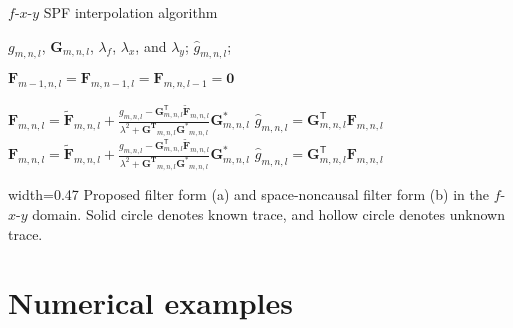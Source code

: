 \renewcommand{\algorithmicrequire}{\textbf{Input:}}
\renewcommand{\algorithmicensure}{\textbf{Output:}}
\begin{algorithm}
    \caption{$f$-$x$-$y$ SPF interpolation algorithm}
    \label{alg:fxyinterp}
    \begin{algorithmic}[1]
        \REQUIRE
        $g_{m,n,l}$, $\mathbf{G}_{m,n,l}$, $\lambda_{f}$, $\lambda_{x}$,
        and $\lambda_{y}$;
        \ENSURE
        $\hat{g}_{m,n,l}$;

        \STATE $ \mathbf{F}_{m-1,n,l}=\mathbf{F}_{m,n-1,l}
            =\mathbf{F}_{m,n,l-1} = \mathbf{0} $

        \STATE
        $ \mathbf{F}_{m,n,l} = \mathbf{\tilde{F}}_{m,n,l} +
            \frac{ g_{m,n,l} - \mathbf{G}_{m,n,l}^{\mathsf{T}} \mathbf{\tilde{F}}_{m,n,l} }
            { \lambda^{2} + \mathbf{G^{T}}_{m,n,l} \mathbf{G^{*}}_{m,n,l} }
            \mathbf{G}_{m,n,l}^{*} $
        \STATE $ \hat{g}_{m,n,l} = \mathbf{G}_{m,n,l}^{\mathsf{T}} \mathbf{F}_{m,n,l} $
        \ENDIF
        \ENDFOR
        \STATE
        $ \mathbf{F}_{m,n,l} = \mathbf{\tilde{F}}_{m,n,l} +
            \frac{ g_{m,n,l} - \mathbf{G}_{m,n,l}^{\mathsf{T}} \mathbf{\tilde{F}}_{m,n,l} }
            { \lambda^{2} + \mathbf{G^{T}}_{m,n,l} \mathbf{G^{*}}_{m,n,l} }
            \mathbf{G}_{m,n,l}^{*} $
        \STATE $ \hat{g}_{m,n,l} = \mathbf{G}_{m,n,l}^{\mathsf{T}} \mathbf{F}_{m,n,l} $
        \ENDIF
        \ENDFOR
        \ENDIF

        \ENDFOR
        \ENDFOR
    \end{algorithmic}
\end{algorithm}

{width=0.47\columnwidth}
{Proposed filter form (a) and space-noncausal filter form (b) in
    the $f$-$x$-$y$ domain. Solid circle denotes known trace,
    and hollow circle denotes unknown trace.}

\section{Numerical examples}

